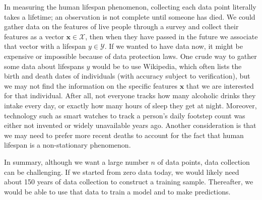 \documentclass[12pt]{article}
\begin{document}
	In measuring the human lifespan phenomenon, collecting each data point
	literally takes a lifetime; an observation is not complete until someone has
	died. We could gather data on the features of live people through a survey
	and collect their features as a vector $\bm{x}\in \mathcal{X}$, then when
	they have passed in the future we associate that vector with a lifespan
	$y\in\mathcal{Y}$. If we wanted to have data now, it might be expensive or
	impossible because of data protection laws. One crude way to gather some
	data about lifespans $y$ would be to use Wikipedia, which often lists the birth and
	death dates of individuals (with accuracy subject to verification), but
	we may not find the information on the specific features $\bm{x}$ that we
	are interested for that individual. After all, not everyone tracks how many
	alcoholic drinks they intake every day, or exactly how many hours of sleep they
	get at night. Moreover, technology such as smart watches to track a person's daily
	footstep count was either not invented or widely unavailable years ago.
	Another consideration is that we may need to prefer more recent deaths to
	account for the fact that human lifespan is a non-stationary phenomenon.
	
	In summary, although we want a large number $n$ of data points, data collection
	can be challenging. If we started from zero data today, we would likely
	need about 150 years of data collection to construct a training sample.
	Thereafter, we would be able to use that data to train a model and
	to make predictions.
\end{document}
